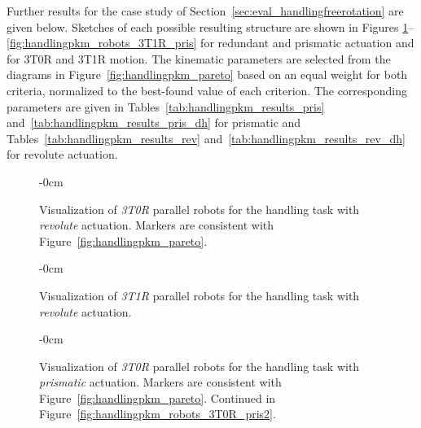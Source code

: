 %
%
%

\label{sec:app_handlingpkm}

Further results for the case study of Section~\ref{sec:eval_handlingfreerotation} are given below.
Sketches of each possible resulting structure are shown in Figures	\ref{fig:handlingpkm_robots_3T0R_rev1}--\ref{fig:handlingpkm_robots_3T1R_pris} for redundant and prismatic actuation and for 3T0R and 3T1R motion.
%
The kinematic parameters are selected from the  diagrams in Figure~\ref{fig:handlingpkm_pareto} based on an equal weight for both criteria, normalized to the best-found value of each criterion.
The corresponding parameters are given in Tables~\ref{tab:handlingpkm_results_pris} and~\ref{tab:handlingpkm_results_pris_dh} for prismatic and Tables~\ref{tab:handlingpkm_results_rev} and~\ref{tab:handlingpkm_results_rev_dh} for revolute actuation.

\vspace{-6pt}
\begin{figure}[H] %
  \begin{adjustwidth}{-\extralength}{0cm}
    \centering
    \graphicspath{{Figures}}
    
    
  \end{adjustwidth}
  \caption{Visualization %
    of \emph{3T0R} parallel robots for the handling task with \emph{revolute} actuation. Markers are consistent with Figure~\ref{fig:handlingpkm_pareto}.}
  \label{fig:handlingpkm_robots_3T0R_rev1}
\end{figure}

%
%
%
%
%
\vspace{-6pt}
\begin{figure}[H]
  \begin{adjustwidth}{-\extralength}{0cm}
    \centering
    \graphicspath{{Figures}}
    
  \end{adjustwidth}
  \caption[Handling task: Visualization of 3T1R parallel robots with revolute actuation]{Visualization of \emph{3T1R} parallel robots for the handling task with \emph{revolute} actuation.}
  \label{fig:handlingpkm_robots_3T1R_rev}
\end{figure}

\vspace{-6pt}
\begin{figure}[H]
  \begin{adjustwidth}{-\extralength}{0cm}
    \centering
    \graphicspath{{Figures}}
    
  \end{adjustwidth}
  \caption[Handling task: Visualization of 3T0R parallel robots with prismatic actuation]{Visualization of \emph{3T0R} parallel robots for the handling task with \emph{prismatic} actuation. Markers are consistent with Figure~\ref{fig:handlingpkm_pareto}. Continued in Figure~\ref{fig:handlingpkm_robots_3T0R_pris2}.}
  \label{fig:handlingpkm_robots_3T0R_pris1}
\end{figure}

